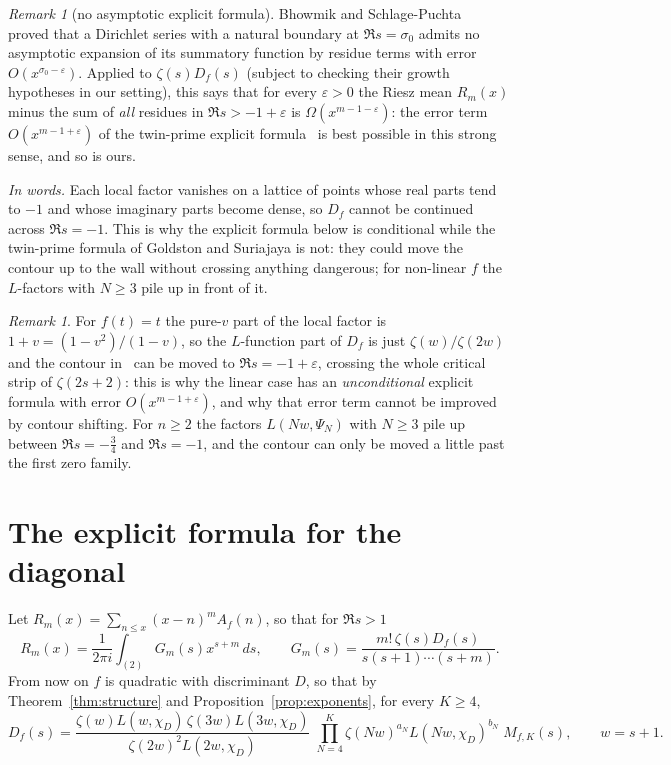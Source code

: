 \documentclass[11pt,a4paper]{article}
\theoremstyle{remark}\newtheorem{remark}[theorem]{Remark}
\begin{document}
\begin{remark}[no asymptotic explicit formula]
Bhowmik and Schlage-Puchta~\cite{BhowmikSchlagePuchta2007} proved that a Dirichlet series with a natural
boundary at $\Re s=\sigma_0$ admits no asymptotic expansion of its summatory function by residue terms with
error $O(x^{\sigma_0-\varepsilon})$. Applied to $\zeta(s)D_f(s)$ (subject to checking their growth hypotheses in our
setting), this says that for every $\varepsilon>0$ the Riesz mean $R_m(x)$ minus the sum of \emph{all} residues
in $\Re s>-1+\varepsilon$ is $\Omega(x^{m-1-\varepsilon})$: the error term $O(x^{m-1+\varepsilon})$ of the
twin-prime explicit formula~\cite{GoldstonSuriajaya2021} is best possible in this strong sense, and so is
ours.
\end{remark}

\emph{In words.} Each local factor vanishes on a lattice of points whose real parts tend to $-1$ and whose
imaginary parts become dense, so $D_f$ cannot be continued across $\Re s=-1$. This is why the explicit formula
below is conditional while the twin-prime formula of Goldston and Suriajaya is not: they could move the
contour up to the wall without crossing anything dangerous; for non-linear $f$ the $L$-factors with $N\ge3$
pile up in front of it.

\begin{remark}
For $f(t)=t$ the pure-$v$ part of the local factor is $1+v=(1-v^2)/(1-v)$, so the $L$-function part of
$D_f$ is just $\zeta(w)/\zeta(2w)$ and the contour in~\cite{GoldstonSuriajaya2021} can be moved to
$\Re s=-1+\varepsilon$, crossing the whole critical strip of $\zeta(2s+2)$: this is why the linear case has
an \emph{unconditional} explicit formula with error $O(x^{m-1+\varepsilon})$, and why that error term cannot
be improved by contour shifting. For $n\ge2$ the factors $L(Nw,\Psi_N)$ with $N\ge3$ pile up between
$\Re s=-\tfrac34$ and $\Re s=-1$, and the contour can only be moved a little past the first zero family.
\end{remark}

\section{The explicit formula for the diagonal}\label{sec:explicit}

Let $R_m(x)=\sum_{n\le x}(x-n)^mA_f(n)$, so that for $\Re s>1$
\begin{equation}\label{eq:mellin}
R_m(x)=\frac1{2\pi i}\int_{(2)}G_m(s)x^{s+m}\,ds,\qquad G_m(s)=\frac{m!\,\zeta(s)D_f(s)}{s(s+1)\cdots(s+m)}.
\end{equation}
From now on $f$ is quadratic with discriminant $D$, so that by Theorem~\ref{thm:structure} and
Proposition~\ref{prop:exponents}, for every $K\ge4$,
\begin{equation}\label{eq:Dquad}
D_f(s)=\frac{\zeta(w)L(w,\chi_D)\,\zeta(3w)L(3w,\chi_D)}{\zeta(2w)^2L(2w,\chi_D)}\;
\prod_{N=4}^{K}\zeta(Nw)^{a_N}L(Nw,\chi_D)^{b_N}\;M_{f,K}(s),\qquad w=s+1.
\end{equation}
\end{document}

